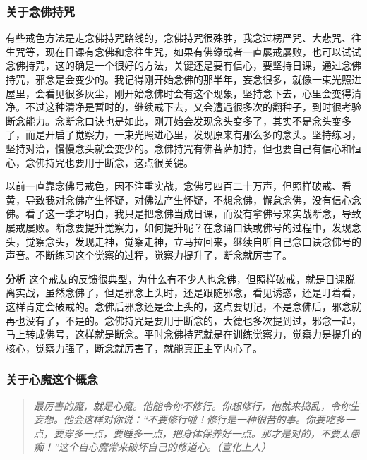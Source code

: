\subsubsection{关于念佛持咒}

有些戒色方法是走念佛持咒路线的，念佛持咒很殊胜，我念过楞严咒、大悲咒、往生咒等，现在日课有念佛和念往生咒，如果有佛缘或者一直屡戒屡败，也可以试试念佛持咒，这的确是一个很好的方法，关键还是要有信心，要坚持日课，通过念佛持咒，邪念是会变少的。我记得刚开始念佛的那半年，妄念很多，就像一束光照进屋里，会看见很多灰尘，刚开始念佛时会有这个现象，坚持念下去，心里会变得清净。不过这种清净是暂时的，继续戒下去，又会遭遇很多次的翻种子，到时很考验断念能力。念断念口诀也是如此，刚开始会发现念头变多了，其实不是念头变多了，而是开启了觉察力，一束光照进心里，发现原来有那么多的念头。坚持练习，坚持对治，慢慢念头就会变少的。念佛持咒有佛菩萨加持，但也要自己有信心和恒心，念佛持咒也要用于断念，这点很关键。

\begin{case}
    以前一直靠念佛号戒色，因不注重实战，念佛号四百二十万声，但照样破戒、看黄，导致我对念佛产生怀疑，对佛法产生怀疑，不想念佛，懈怠念佛，没有信心念佛。看了这一季才明白，我只是把念佛当成日课，而没有拿佛号来实战断念，导致屡戒屡败。断念要提升觉察力，如何提升呢？在念诵口诀或佛号的过程中，发现念头，觉察念头，发现走神，觉察走神，立马拉回来，继续自听自己念口诀念佛号的声音。不断练习这个觉察的过程，觉察力提升了，断念就厉害了。

    \textbf{分析} 这个戒友的反馈很典型，为什么有不少人也念佛，但照样破戒，就是日课脱离实战，虽然念佛了，但是邪念上头时，还是跟随邪念，看见诱惑，还是盯着看，这样肯定会破戒的。念佛后邪念还是会上头的，这点要切记，不是念佛后，邪念就再也没有了，不是的。念佛持咒是要用于断念的，大德也多次提到过，邪念一起，马上转成佛号，这样就是断念。平时念佛持咒就是在训练觉察力，觉察力是提升的核心，觉察力强了，断念就厉害了，就能真正主宰内心了。
\end{case}

\subsubsection{关于心魔这个概念}

\begin{quote}\it
    最厉害的魔，就是心魔。他能令你不修行。你想修行，他就来捣乱，令你生妄想。他会这样对你说：“不要修行啦！修行是一种很苦的事。你要吃多一点，要穿多一点，要睡多一点，把身体保养好一点。那才是对的，不要太愚痴！”这个自心魔常来破坏自己的修道心。（宣化上人）
\end{quote}

